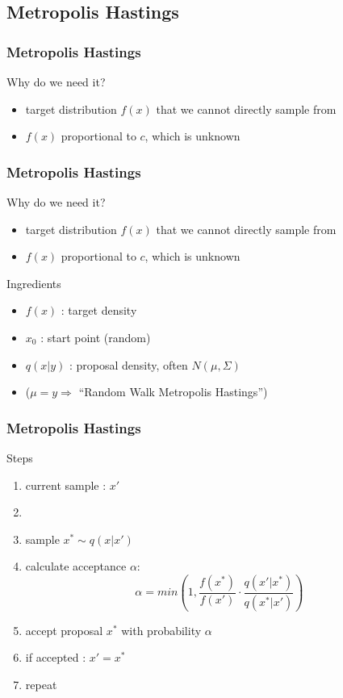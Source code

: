 
\subsection{Metropolis Hastings}


\begin{frame}
\frametitle{Metropolis Hastings}

\begin{block}{Why do we need it?}
\begin{itemize}
\item target distribution $f(x)$ that we cannot directly sample from
\item $f(x)$ proportional to $c$, which is unknown
\end{itemize}
\end{block}

\end{frame}


\begin{frame}
\frametitle{Metropolis Hastings}

\begin{block}{Why do we need it?}
\begin{itemize}
\item target distribution $f(x)$ that we cannot directly sample from
\item $f(x)$ proportional to $c$, which is unknown
\end{itemize}
\end{block}

\begin{block}{Ingredients}
\begin{itemize}
\item $f(x)$ : target density
\item $x_0$ : start point (random)
\item $q(x|y)$ : proposal density, often $N(\mu, \Sigma)$ \\
\item[] \quad \quad  \quad  \quad  ($\mu = y \Rightarrow$ ``Random Walk
Metropolis Hastings'')
\end{itemize}
\end{block}

\end{frame}

\begin{frame}
\frametitle{Metropolis Hastings}

\begin{block}{Steps}
\begin{enumerate}
  \item current sample : $x'$
  \item[]
\item sample $x^* \sim q(x | x')$
\item calculate acceptance $\alpha$:
\[\alpha = min\left(1, \frac{f(x^*)}{f(x')} \cdot
\frac{q(x'|x^*)}{q(x^*|x')} \right)\]

\item accept proposal $x^*$ with probability $\alpha$
\item if accepted : $x' = x^*$
\item repeat
\end{enumerate}
\end{block}
\end{frame}


